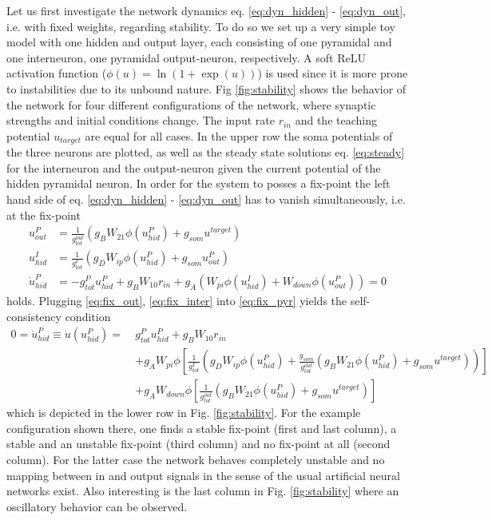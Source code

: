 \documentclass[12pt,a4paper]{article}
\begin{document}
Let us first investigate the network dynamics eq. \eqref{eq:dyn_hidden} - \eqref{eq:dyn_out}, i.e. with fixed weights, regarding stability. To do so we set up a very simple toy model with one hidden and output layer, each consisting of one pyramidal and one interneuron, one pyramidal output-neuron, respectively. A soft ReLU activation function ($\phi(u) = \ln(1 + \exp(u))$) is used since it is more prone to instabilities due to its unbound nature. Fig \ref{fig:stability} shows the behavior of the network for four different configurations of the network, where synaptic strengths and initial conditions change. The input rate $r_{in}$ and the teaching potential $u_{target}$ are equal for all cases. In the upper row the soma potentials of the three neurons are plotted, as well as the steady state solutions eq. \eqref{eq:steady} for the interneuron and the output-neuron given the current potential of the hidden pyramidal neuron.
In order for the system to posses a fix-point the left hand side of eq. \eqref{eq:dyn_hidden} - \eqref{eq:dyn_out} has to vanish simultaneously, i.e. at the fix-point
\begin{align}
u^{P}_{out} &= \frac{1}{g^{out}_{tot}}\left( g_B W_{21}\phi(u^P_{hid}) + g_{som}u^{target}\right) \label{eq:fix_out}\\
u^{I}_{hid} &= \frac{1}{g^{I}_{tot}}\left( g_D W_{ip}\phi(u^P_{hid}) + g_{som}u^{P}_{out}\right) \label{eq:fix_inter}\\
\dot{u}^P_{hid} &= -g^{P}_{tot}u^P_{hid} + g_B W_{10}r_{in} + g_A\left(W_{pi}\phi(u^I_{hid}) + W_{down}\phi(u^P_{out})\right) = 0 \label{eq:fix_pyr}
\end{align}
holds. Plugging \eqref{eq:fix_out}, \eqref{eq:fix_inter} into \eqref{eq:fix_pyr} yields the self-consistency condition
\begin{align}
0 = \dot{u}^P_{hid} \equiv \dot{u}(u^P_{hid}) = ~&g^P_{tot}u^P_{hid} + g_B W_{10}r_{in} \nonumber\\
&+ g_AW_{pi}\phi\left[\frac{1}{g^I_{tot}}\left( g_D W_{ip}\phi(u^P_{hid}) + \frac{g_{som}}{g^{out}_{tot}}\left( g_B W_{21}\phi(u^P_{hid}) + g_{som}u^{target}\right)\right)\right] \nonumber\\
&+ g_AW_{down}\phi\left[\frac{1}{g^{out}_{tot}}\left( g_B W_{21}\phi(u^P_{hid}) + g_{som}u^{target}\right)\right]
\end{align}
which is depicted in the lower row in Fig. \ref{fig:stability}. For the example configuration shown there, one finds a stable fix-point (first and last column), a stable and an unstable fix-point (third column) and no fix-point at all (second column). For the latter case the network behaves completely unstable and no mapping between in and output signals in the sense of the usual artificial neural networks exist. Also interesting is the last column in Fig. \ref{fig:stability} where an oscillatory behavior can be observed.
\end{document}
